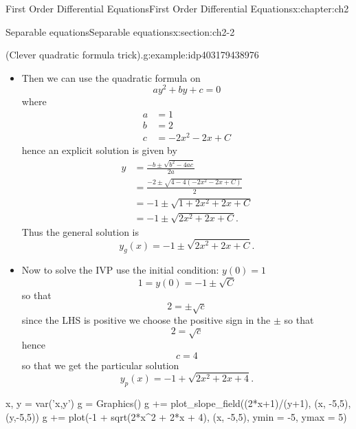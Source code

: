 \documentclass[oneside,10pt,]{book}
\numberwithin{equation}{section}
\numberwithin{equation}{section}
\newcommand{\amp}{&}
\begin{document}
\begin{chapterptx}{First Order Differential Equations}{}{First Order Differential Equations}{}{}{x:chapter:ch2}
\begin{sectionptx}{Separable equations}{}{Separable equations}{}{}{x:section:ch2-2}
\begin{example}{(Clever quadratic formula trick).}{g:example:idp403179438976}
\begin{itemize}[label=\textbullet]
\begin{align*}
\frac{dy}{dt}=\frac{2x+1}{y+1} \amp \iff \amp \int\left(y+1\right)dy=\int\left(2x+1\right)dx\\
\amp \iff \amp \frac{y^{2}}{2}+y=x^{2}+x+C\\
\amp \iff \amp \frac{y^{2}}{2}+y-x^{2}-x+c=0\\
\amp \iff \amp y^{2}+2y-2x^{2}-2x+C=0
\end{align*}
%
\item{}Then we can use the quadratic formula on%
\begin{equation*}
ay^{2}+by+c=0
\end{equation*}
where%
\begin{align*}
a \amp =1\\
b \amp =2\\
c \amp =-2x^{2}-2x+C
\end{align*}
hence an explicit solution is given by%
\begin{align*}
y \amp =\frac{-b\pm\sqrt{b^{2}-4ac}}{2a}\\
\amp =\frac{-2\pm\sqrt{4-4\left(-2x^{2}-2x+C\right)}}{2}\\
\amp =-1\pm\sqrt{1+2x^{2}+2x+C}\\
\amp =-1\pm\sqrt{2x^{2}+2x+C}.
\end{align*}
Thus the general solution is%
\begin{equation*}
y_g(x)=-1\pm\sqrt{2x^{2}+2x+C}.
\end{equation*}
%
\item{}Now to solve the IVP use the initial condition: \(y(0)=1\)%
\begin{equation*}
1=y(0)=-1\pm\sqrt{C}
\end{equation*}
so that%
\begin{equation*}
2=\pm\sqrt{c}
\end{equation*}
since the LHS is positive we choose the positive sign in the \(\pm\) so that%
\begin{equation*}
2=\sqrt{c}
\end{equation*}
hence%
\begin{equation*}
c=4
\end{equation*}
so that we get the particular solution%
\begin{equation*}
y_p(x)=-1+\sqrt{2x^{2}+2x+4}.
\end{equation*}
%
\end{itemize}
\begin{sageinput}
x, y = var('x,y')
g = Graphics()
g += plot_slope_field((2*x+1)/(y+1), (x, -5,5),(y,-5,5))
g += plot(-1 + sqrt(2*x^2 + 2*x + 4), (x, -5,5), ymin = -5, ymax = 5)

\end{sageinput}
\end{example}
\end{sectionptx}
\end{chapterptx}
\end{document}
